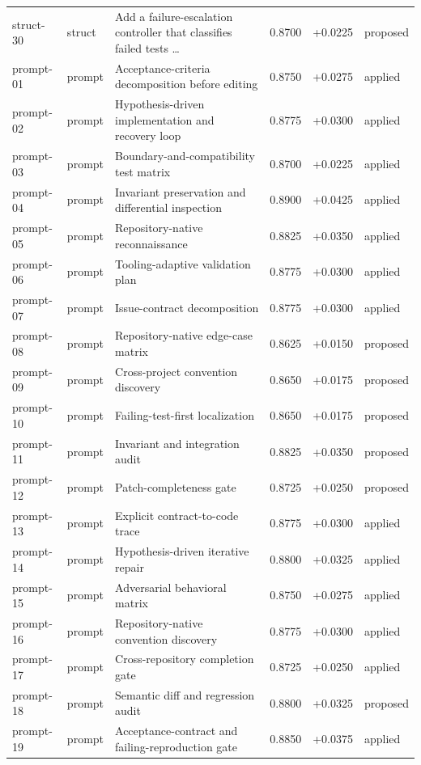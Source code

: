 \begin{center}
\begin{longtable}{llp{5.2cm}rrl}
struct-30 & struct & Add a failure-escalation controller that classifies failed tests \ldots{} & 0.8700 & +0.0225 & proposed \\
prompt-01 & prompt & Acceptance-criteria decomposition before editing & 0.8750 & +0.0275 & applied \\
prompt-02 & prompt & Hypothesis-driven implementation and recovery loop & 0.8775 & +0.0300 & applied \\
prompt-03 & prompt & Boundary-and-compatibility test matrix & 0.8700 & +0.0225 & applied \\
prompt-04 & prompt & Invariant preservation and differential inspection & 0.8900 & +0.0425 & applied \\
prompt-05 & prompt & Repository-native reconnaissance & 0.8825 & +0.0350 & applied \\
prompt-06 & prompt & Tooling-adaptive validation plan & 0.8775 & +0.0300 & applied \\
prompt-07 & prompt & Issue-contract decomposition & 0.8775 & +0.0300 & applied \\
prompt-08 & prompt & Repository-native edge-case matrix & 0.8625 & +0.0150 & proposed \\
prompt-09 & prompt & Cross-project convention discovery & 0.8650 & +0.0175 & proposed \\
prompt-10 & prompt & Failing-test-first localization & 0.8650 & +0.0175 & proposed \\
prompt-11 & prompt & Invariant and integration audit & 0.8825 & +0.0350 & proposed \\
prompt-12 & prompt & Patch-completeness gate & 0.8725 & +0.0250 & proposed \\
prompt-13 & prompt & Explicit contract-to-code trace & 0.8775 & +0.0300 & applied \\
prompt-14 & prompt & Hypothesis-driven iterative repair & 0.8800 & +0.0325 & applied \\
prompt-15 & prompt & Adversarial behavioral matrix & 0.8750 & +0.0275 & applied \\
prompt-16 & prompt & Repository-native convention discovery & 0.8775 & +0.0300 & applied \\
prompt-17 & prompt & Cross-repository completion gate & 0.8725 & +0.0250 & applied \\
prompt-18 & prompt & Semantic diff and regression audit & 0.8800 & +0.0325 & proposed \\
prompt-19 & prompt & Acceptance-contract and failing-reproduction gate & 0.8850 & +0.0375 & applied \\

\end{longtable}
\end{center}
